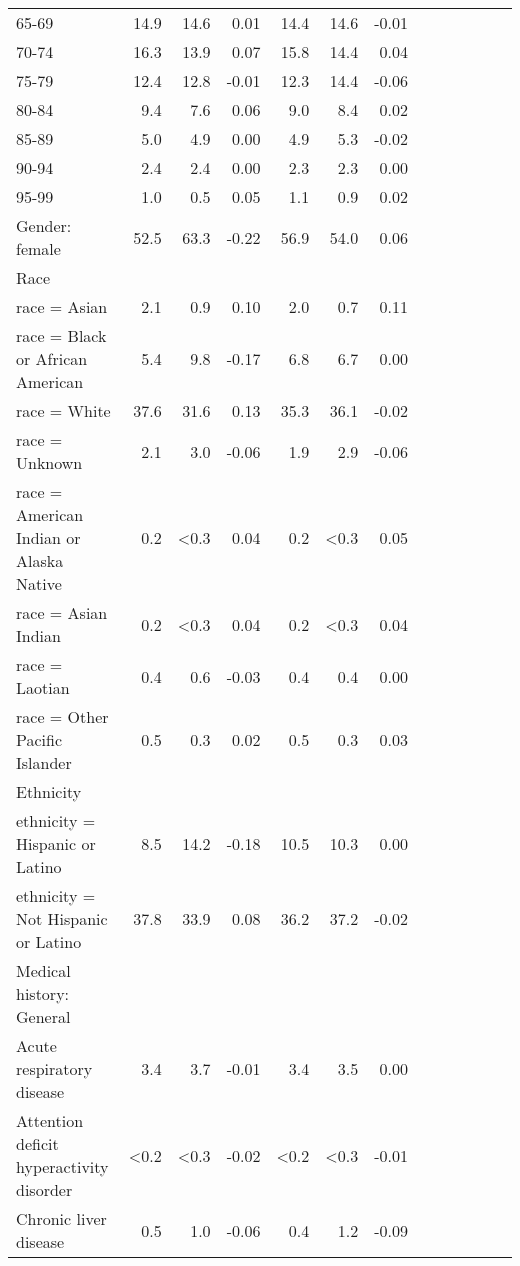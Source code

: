 \documentclass[11pt,]{article}
\begin{document}
\begin{longtable}{lrrrrrrrrrrrr}
      65-69 & 14.9 & 14.6 &  0.01 & 14.4 & 14.6 & -0.01 \\ 
      70-74 & 16.3 & 13.9 &  0.07 & 15.8 & 14.4 &  0.04 \\ 
      75-79 & 12.4 & 12.8 & -0.01 & 12.3 & 14.4 & -0.06 \\ 
      80-84 &  9.4 &  7.6 &  0.06 &  9.0 &  8.4 &  0.02 \\ 
      85-89 &  5.0 &  4.9 &  0.00 &  4.9 &  5.3 & -0.02 \\ 
      90-94 &  2.4 &  2.4 &  0.00 &  2.3 &  2.3 &  0.00 \\ 
      95-99 &  1.0 &  0.5 &  0.05 &  1.1 &  0.9 &  0.02 \\ 
  Gender: female & 52.5 & 63.3 & -0.22 & 56.9 & 54.0 &  0.06 \\ 
  Race &    &    &     &    &    &     \\ 
      race = Asian &  2.1 &  0.9 &  0.10 &  2.0 &  0.7 &  0.11 \\ 
      race = Black or African American &  5.4 &  9.8 & -0.17 &  6.8 &  6.7 &  0.00 \\ 
      race = White & 37.6 & 31.6 &  0.13 & 35.3 & 36.1 & -0.02 \\ 
      race = Unknown &  2.1 &  3.0 & -0.06 &  1.9 &  2.9 & -0.06 \\ 
      race = American Indian or Alaska Native &  0.2 & <0.3 &  0.04 &  0.2 & <0.3 &  0.05 \\ 
      race = Asian Indian &  0.2 & <0.3 &  0.04 &  0.2 & <0.3 &  0.04 \\ 
      race = Laotian &  0.4 &  0.6 & -0.03 &  0.4 &  0.4 &  0.00 \\ 
      race = Other Pacific Islander &  0.5 &  0.3 &  0.02 &  0.5 &  0.3 &  0.03 \\ 
  Ethnicity &    &    &     &    &    &     \\ 
      ethnicity = Hispanic or Latino &  8.5 & 14.2 & -0.18 & 10.5 & 10.3 &  0.00 \\ 
      ethnicity = Not Hispanic or Latino & 37.8 & 33.9 &  0.08 & 36.2 & 37.2 & -0.02 \\ 
  Medical history: General &    &    &     &    &    &     \\ 
      Acute respiratory disease &  3.4 &  3.7 & -0.01 &  3.4 &  3.5 &  0.00 \\ 
      Attention deficit hyperactivity disorder & <0.2 & <0.3 & -0.02 & <0.2 & <0.3 & -0.01 \\ 
      Chronic liver disease &  0.5 &  1.0 & -0.06 &  0.4 &  1.2 & -0.09 \\ 

\end{longtable}
\end{document}
